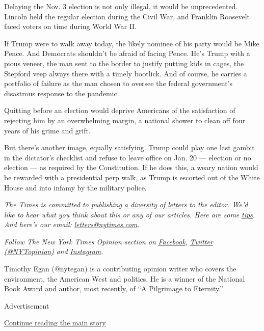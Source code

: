 Delaying the Nov. 3 election is not only illegal, it would be
unprecedented. Lincoln held the regular election during the Civil War,
and Franklin Roosevelt faced voters on time during World War II.

If Trump were to walk away today, the likely nominee of his party would
be Mike Pence. And Democrats shouldn't be afraid of facing Pence. He's
Trump with a pious veneer, the man sent to the border to justify putting
kids in cages, the Stepford veep always there with a timely bootlick.
And of course, he carries a portfolio of failure as the man chosen to
oversee the federal government's disastrous response to the pandemic.

Quitting before an election would deprive Americans of the satisfaction
of rejecting him by an overwhelming margin, a national shower to clean
off four years of his grime and grift.

But there's another image, equally satisfying. Trump could play one last
gambit in the dictator's checklist and refuse to leave office on Jan. 20
--- election or no election --- as required by the Constitution. If he
does this, a weary nation would be rewarded with a presidential perp
walk, as Trump is escorted out of the White House and into infamy by the
military police.

\emph{The Times is committed to publishing}
\href{https://www.nytimes.com/2019/01/31/opinion/letters/letters-to-editor-new-york-times-women.html}{\emph{a
diversity of letters}} \emph{to the editor. We'd like to hear what you
think about this or any of our articles. Here are some}
\href{https://help.nytimes.com/hc/en-us/articles/115014925288-How-to-submit-a-letter-to-the-editor}{\emph{tips}}\emph{.
And here's our email:}
\href{mailto:letters@nytimes.com}{\emph{letters@nytimes.com}}\emph{.}

\emph{Follow The New York Times Opinion section on}
\href{https://www.facebook.com/nytopinion}{\emph{Facebook}}\emph{,}
\href{http://twitter.com/NYTOpinion}{\emph{Twitter (@NYTopinion)}}
\emph{and}
\href{https://www.instagram.com/nytopinion/}{\emph{Instagram}}\emph{.}

Timothy Egan (@nytegan) is a contributing opinion writer who covers the
environment, the American West and politics. He is a winner of the
National Book Award and author, most recently, of ``A Pilgrimage to
Eternity.''

Advertisement

\protect\hyperlink{after-bottom}{Continue reading the main story}

